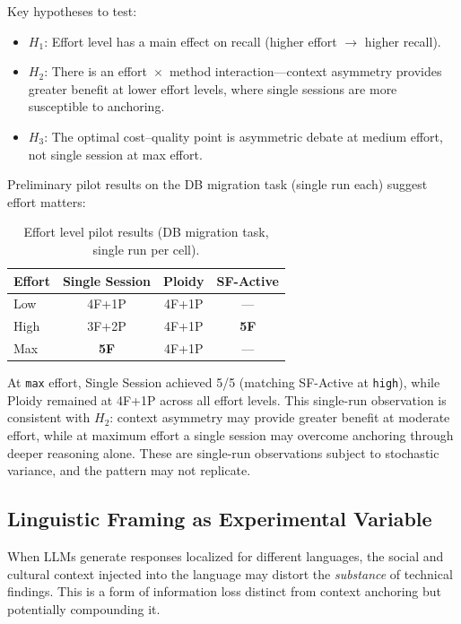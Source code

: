 \documentclass[11pt]{article}
\begin{document}
Key hypotheses to test:
\begin{itemize}[leftmargin=1.5em]
  \item $H_1$: Effort level has a main effect on recall (higher effort $\to$ higher recall).
  \item $H_2$: There is an effort~$\times$~method interaction---context asymmetry provides greater benefit at lower effort levels, where single sessions are more susceptible to anchoring.
  \item $H_3$: The optimal cost--quality point is asymmetric debate at medium effort, not single session at max effort.
\end{itemize}

Preliminary pilot results on the DB migration task (single run each) suggest effort matters:

\begin{table}[H]
\centering
\caption{Effort level pilot results (DB migration task, single run per cell).}
\label{tab:effort-pilot}
\small
\begin{tabular}{@{}lccc@{}}
\toprule
\textbf{Effort} & \textbf{Single Session} & \textbf{Ploidy} & \textbf{SF-Active} \\
\midrule
Low  & 4F+1P & 4F+1P & ---   \\
High & 3F+2P & 4F+1P & \textbf{5F} \\
Max  & \textbf{5F}    & 4F+1P & ---   \\
\bottomrule
\end{tabular}
\end{table}

\noindent At \texttt{max} effort, Single Session achieved 5/5 (matching SF-Active at \texttt{high}), while Ploidy remained at 4F+1P across all effort levels. This single-run observation is consistent with $H_2$: context asymmetry may provide greater benefit at moderate effort, while at maximum effort a single session may overcome anchoring through deeper reasoning alone. These are single-run observations subject to stochastic variance, and the pattern may not replicate.

\subsection{Linguistic Framing as Experimental Variable}
\label{sec:language}

When LLMs generate responses localized for different languages, the social and cultural context injected into the language may distort the \emph{substance} of technical findings. This is a form of information loss distinct from context anchoring but potentially compounding it.
\end{document}

